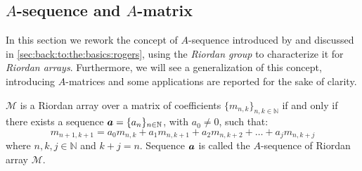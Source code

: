 
\subsection{$A$-sequence and $A$-matrix}
\label{sec:back:to:the:basics:sequences}

In this section we rework the concept of $A$-sequence introduced by
\citeauthor{rogers:1977} and discussed in
\autoref{sec:back:to:the:basics:rogers}, using the \emph{Riordan group} to
characterize it for \emph{Riordan arrays}. Furthermore, we will see a
generalization of this concept, introducing $A$-matrices and some applications
are reported for the sake of clarity.

\begin{theorem}
    $\mathcal{M}$ is a Riordan array over a matrix of coefficients
    $\lbrace m_{n,k}\rbrace_{n,k\in\mathbb{N}}$ if and only if
    there exists a sequence $\boldsymbol{a}=\lbrace a_{n}\rbrace_{n\in\mathbb{N}}$,
    with $a_{0}\neq0$, such that:
    \begin{displaymath}
        m_{n+1,k+1}=a_{0}m_{n,k}+a_{1}m_{n,k+1}+a_{2}m_{n,k+2}+\ldots+a_{j}m_{n,k+j}
    \end{displaymath}
    where $n,k,j\in\mathbb{N}$ and $k+j=n$. Sequence $\boldsymbol{a}$ is called the $A$-sequence
    of Riordan array $\mathcal{M}$. 
    \label{thm:merlini:A:sequence:characterization} 
\end{theorem}
